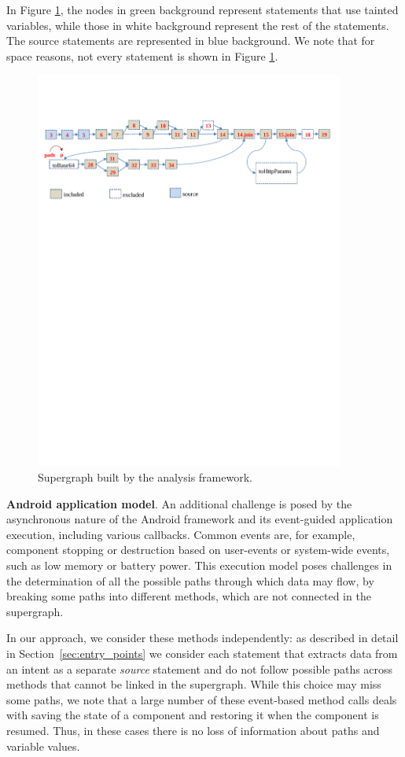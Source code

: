 In Figure \ref{fig:supergraph}, the nodes in green background represent statements that use tainted variables, while those in white background represent the rest of the statements. The source statements are represented in blue background. We note that for space reasons, not every statement is shown in Figure \ref{fig:supergraph}. 

\begin{figure}[t]
  \centering
    \includegraphics[width=4in]{./images/supergraph.pdf}
  \caption{Supergraph built by the analysis framework. \label{fig:supergraph}}
 \end{figure}

\noindent
\textbf{Android application model}. An additional challenge is posed by the asynchronous nature of the Android framework and its event-guided application execution, including various callbacks. Common events are, for example, component stopping or destruction based on user-events or system-wide events, such as low memory or battery power. This execution model poses challenges in the determination of all the possible paths through which data may flow, by breaking some paths into different methods, which are not connected in the supergraph.

In our approach, we consider these methods independently: as described in detail in Section~\ref{sec:entry_points} we consider each statement that extracts data from an intent as a separate \textit{source} statement and do not follow possible paths across methods that cannot be linked in the supergraph. While this choice may miss some paths, we note that a large number of these event-based method calls deals with saving the state of a component and restoring it when the component is resumed. Thus, in these cases there is no loss of information about paths and variable values.

